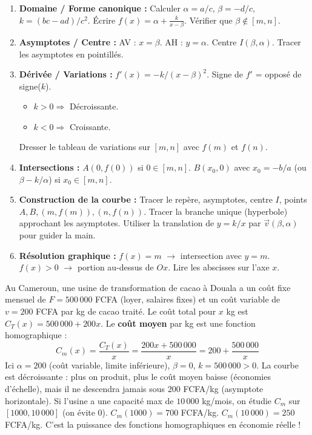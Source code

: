 \documentclass[11pt]{article}
\begin{document}
\begin{methode}
\begin{enumerate}
    \item \textbf{Domaine / Forme canonique :} Calculer $\alpha = a/c$, $\beta = -d/c$, $k = (bc-ad)/c^2$. Écrire $f(x) = \alpha + \frac{k}{x-\beta}$. Vérifier que $\beta \notin [m, n]$.
    \item \textbf{Asymptotes / Centre :} AV : $x=\beta$. AH : $y=\alpha$. Centre $I(\beta, \alpha)$. Tracer les asymptotes en pointillés.
    \item \textbf{Dérivée / Variations :} $f'(x) = -k/(x-\beta)^2$. Signe de $f'$ = opposé de signe($k$).
        \begin{itemize}
            \item $k>0 \Rightarrow$ Décroissante.
            \item $k<0 \Rightarrow$ Croissante.
        \end{itemize}
        Dresser le tableau de variations sur $[m, n]$ avec $f(m)$ et $f(n)$.
    \item \textbf{Intersections :} $A(0, f(0))$ si $0 \in [m, n]$. $B(x_0, 0)$ avec $x_0 = -b/a$ (ou $\beta - k/\alpha$) si $x_0 \in [m, n]$.
    \item \textbf{Construction de la courbe :} Tracer le repère, asymptotes, centre $I$, points $A, B, (m, f(m)), (n, f(n))$. Tracer la branche unique (hyperbole) approchant les asymptotes. Utiliser la translation de $y=k/x$ par $\vec{v}(\beta, \alpha)$ pour guider la main.
    \item \textbf{Résolution graphique :} $f(x)=m$ $\rightarrow$ intersection avec $y=m$. $f(x)>0$ $\rightarrow$ portion au-dessus de $Ox$. Lire les abscisses sur l'axe $x$.
\end{enumerate}
\end{methode}

\begin{savaistu}
Au Cameroun, une usine de transformation de cacao à Douala a un coût fixe mensuel de $F = 500\,000$ FCFA (loyer, salaires fixes) et un coût variable de $v = 200$ FCFA par kg de cacao traité. Le coût total pour $x$ kg est $C_T(x) = 500\,000 + 200x$.
Le \textbf{coût moyen} par kg est une fonction homographique :
\[ C_m(x) = \frac{C_T(x)}{x} = \frac{200x + 500\,000}{x} = 200 + \frac{500\,000}{x} \]
Ici $\alpha = 200$ (coût variable, limite inférieure), $\beta = 0$, $k = 500\,000 > 0$.
La courbe est décroissante : plus on produit, plus le coût moyen baisse (économies d'échelle), mais il ne descendra jamais sous $200$ FCFA/kg (asymptote horizontale).
Si l'usine a une capacité max de $10\,000$ kg/mois, on étudie $C_m$ sur $[1000, 10\,000]$ (on évite $0$).
$C_m(1000) = 700$ FCFA/kg. $C_m(10\,000) = 250$ FCFA/kg.
C'est la puissance des fonctions homographiques en économie réelle !
\end{savaistu}
\end{document}
